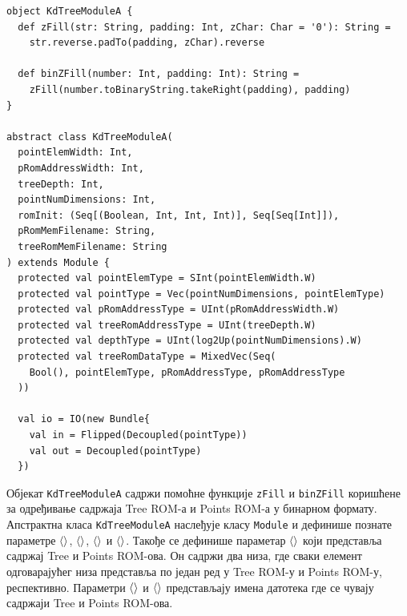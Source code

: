 \documentclass[master]{finthesis}
\newcommand*{\correctmath}[1]{%
    \ifcsname mathCorrectionFor#1\endcsname%
        \csname mathCorrectionFor#1\endcsname%
    \else%
        #1%
    \fi%
}
\newcommand*{\mfield}[1]{{\langle\correctmath{#1}\/\rangle}}
\newcommand*{\field}[1]{\texorpdfstring{$\mfield{#1}$}{⟨#1⟩}}
\newcommand*{\prog}[1]{\texttt{#1}}
\newcommand*{\func}[1]{\prog{#1}}
\begin{document}
\begin{lstlisting}[style=Chisel, caption={Декларација класе \prog{KdTreeModuleA} и Chisel типова података поља те класе.}, label={lst:abstract-kd:decl}]
object KdTreeModuleA {
  def zFill(str: String, padding: Int, zChar: Char = '0'): String =
    str.reverse.padTo(padding, zChar).reverse

  def binZFill(number: Int, padding: Int): String =
    zFill(number.toBinaryString.takeRight(padding), padding)
}

abstract class KdTreeModuleA(
  pointElemWidth: Int,
  pRomAddressWidth: Int,
  treeDepth: Int,
  pointNumDimensions: Int,
  romInit: (Seq[(Boolean, Int, Int, Int)], Seq[Seq[Int]]),
  pRomMemFilename: String,
  treeRomMemFilename: String
) extends Module {
  protected val pointElemType = SInt(pointElemWidth.W)
  protected val pointType = Vec(pointNumDimensions, pointElemType)
  protected val pRomAddressType = UInt(pRomAddressWidth.W)
  protected val treeRomAddressType = UInt(treeDepth.W)
  protected val depthType = UInt(log2Up(pointNumDimensions).W)
  protected val treeRomDataType = MixedVec(Seq(
    Bool(), pointElemType, pRomAddressType, pRomAddressType
  ))

  val io = IO(new Bundle{
    val in = Flipped(Decoupled(pointType))
    val out = Decoupled(pointType)
  })
\end{lstlisting}

Објекат \prog{KdTreeModuleA} садржи помоћне функције \func{zFill} и \func{binZFill} коришћене за одређивање садржаја Tree ROM-а и Points ROM-а у бинарном формату. Апстрактна класа \prog{KdTreeModuleA} наслеђује класу \prog{Module} и дефинише познате параметре \field{pointElemWidth}, \field{pRomAddressWidth}, \field{treeDepth} и \field{pointNumDimensions}. Такође се дефинише параметар \field{romInit} који представља садржај Tree и Points ROM-ова. Он садржи два низа, где сваки елемент одговарајућег низа представља по један ред у Tree ROM-у и Points ROM-у, респективно. Параметри \field{pRomFilename} и \field{treeRomFilename} представљају имена датотека где се чувају садржаји Tree и Points ROM-ова.
\end{document}
